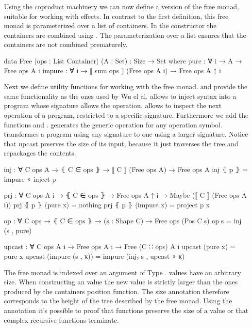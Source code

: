 Using the coproduct machinery we can now define a version of the free monad,
suitable for working with effects.
In contrast to the first definition, this free monad is parameterized over a
list of containers.
In the  constructor the containers are combined
using .
The parameterization over a list ensures that the containers are not combined
prematurely.

\begin{code}
data Free (ops : List Container) (A : Set) : {Size} → Set where
  pure    : ∀ {i} → A → Free ops A {i}
  impure  : ∀ {i} → ⟦ sum ops ⟧ (Free ops A {i}) → Free ops A {↑ i}
\end{code}
Next we define utility functions for working with the free monad.
 and  provide the same functionality as the
ones used by Wu el al.
 allows to inject syntax into a program whose signature allows
the operation.
 allows to inspect the next operation of a
program, restricted to a specific signature.
Furthermore we add the functions  and .
 generates the generic operation for any operation symbol.
 transformes a program using any signature to one using a
larger signature.
Notice that upcast prserves the size of its input, because it just traverses the
tree and repackages the contents.

\begin{code}
inj : ∀ {C ops A} → ⦃ C ∈ ops ⦄ → ⟦ C ⟧ (Free ops A) → Free ops A
inj ⦃ p ⦄ = impure ∘ inject p

prj : ∀ {C ops A i} → ⦃ C ∈ ops ⦄ → Free ops A {↑ i} → Maybe (⟦ C ⟧ (Free ops A {i}))
prj ⦃ p ⦄ (pure x)    = nothing
prj ⦃ p ⦄ (impure x)  = project p x

op : ∀ {C ops} → ⦃ C ∈ ops ⦄ → (s : Shape C) → Free ops (Pos C s)
op s = inj (s , pure)

upcast : ∀ {C ops A i} → Free ops A {i} → Free (C ∷ ops) A {i}
upcast (pure x) = pure x
upcast (impure (s , κ)) = impure (inj₂ s , upcast ∘ κ)
\end{code}
The free monad is indexed over an argument of Type .
 values have an arbitrary size.
When constructing an  value the new value is
strictly larger than the ones produced by the containers position function.
The size annotation therefore corresponds to the height of the tree described by
the free monad.
Using the annotation it's possible to proof that functions preserve the size of
a value or that complex recursive functions terminate.

